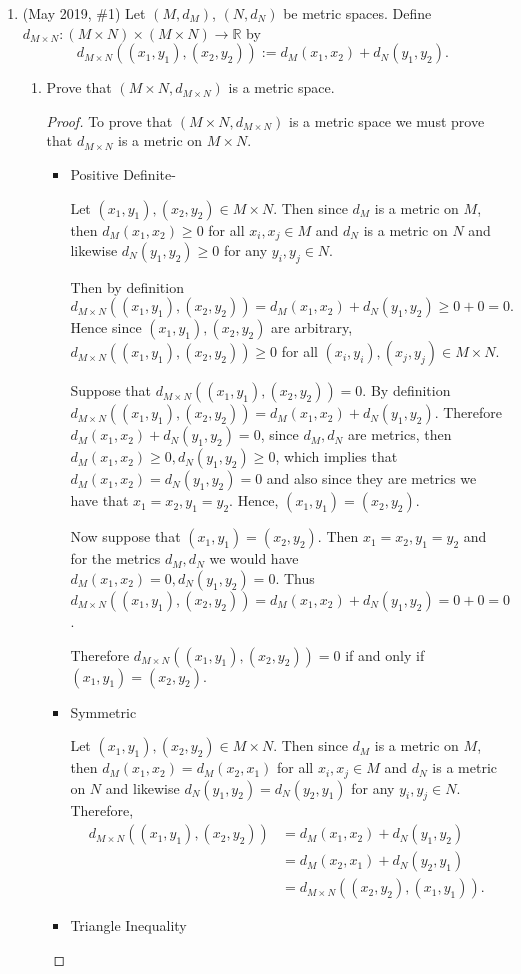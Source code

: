 \documentclass[reqno]{article}
\theoremstyle{remark}
\numberwithin{equation}{section}
\newcommand{\R}{\mathbb{R}}
\begin{document}
\begin{enumerate} 

\item (May 2019, \#1) Let $(M, d_M)$, $(N, d_N)$ be metric spaces. Define $d_{M \times N} \colon (M \times N) \times (M \times N) \to \R$ by $$d_{M \times N}((x_1, y_1), (x_2, y_2)) := d_M(x_1, x_2) + d_N(y_1, y_2).$$
\begin{enumerate}
	
\item Prove that $(M \times N, d_{M \times N})$ is a metric space. 

\begin{proof} 
To prove that $(M \times N, d_{M \times N})$ is a metric space we must prove that $d_{M\times N}$ is a metric on $M \times N$.

\begin{itemize}
    \item Positive Definite-
    
    Let $(x_1,y_1), (x_2,y_2) \in M \times N$. Then  since $d_M$ is a metric on $M$, then $d_M(x_1,x_2)\geq 0$ for all $x_i,x_j \in M$ and $d_N$ is a metric on $N$ and likewise $d_N(y_1,y_2)\geq 0$ for any $y_i,y_j \in N.$
    
    Then by definition $d_{M\times N}((x_1,y_1),(x_2,y_2))=d_M(x_1,x_2)+d_N(y_1,y_2)\geq 0 + 0 =0.$ Hence since $(x_1,y_1),(x_2,y_2)$ are arbitrary, $d_{M\times N}((x_1,y_1),(x_2,y_2))\geq 0$ for all $(x_i,y_i),(x_j,y_j)\in M \times N$.
    
    Suppose that $d_{M \times N}((x_1,y_1),(x_2,y_2))=0.$ By definition $d_{M \times N}((x_1,y_1),(x_2,y_2))=d_M(x_1,x_2)+d_N(y_1,y_2)$. Therefore $d_M(x_1,x_2)+d_N(y_1,y_2)=0$, since $d_M, d_N$ are metrics, then $d_M(x_1,x_2)\geq 0, d_N(y_1,y_2)\geq 0$, which implies that $d_M(x_1,x_2)=d_N(y_1,y_2)=0$ and also since they are metrics we have that $x_1=x_2, y_1=y_2.$ Hence, $(x_1,y_1)=(x_2,y_2).$
    
    Now suppose that $(x_1,y_1)=(x_2,y_2).$ Then $x_1=x_2, y_1=y_2$ and for the metrics $d_M, d_N$ we would have $d_M(x_1,x_2)=0, d_N(y_1,y_2)=0.$ Thus $d_{M \times N}((x_1,y_1),(x_2,y_2))=d_M(x_1,x_2)+d_N(y_1,y_2)=0+0=0$.
    
    Therefore $d_{M \times N}((x_1,y_1),(x_2,y_2))=0$ if and only if $(x_1,y_1)=(x_2,y_2).$
    \item Symmetric
    
    Let $(x_1,y_1), (x_2,y_2) \in M \times N$. Then  since $d_M$ is a metric on $M$, then $d_M(x_1,x_2)=d_M(x_2,x_1)$ for all $x_i,x_j \in M$ and $d_N$ is a metric on $N$ and likewise $d_N(y_1,y_2)=d_N(y_2,y_1)$ for any $y_i,y_j \in N.$ Therefore,
    \begin{align*}
        d_{M \times N}((x_1,y_1),(x_2,y_2))&=d_M(x_1,x_2)+d_N(y_1,y_2)\\
        &=d_M(x_2,x_1)+d_N(y_2,y_1)\\
        &=d_{M \times N}((x_2,y_2),(x_1,y_1)).
    \end{align*}
    \item Triangle Inequality
    

\end{itemize}
\end{proof}
\end{enumerate}
\end{enumerate}
\end{document}
